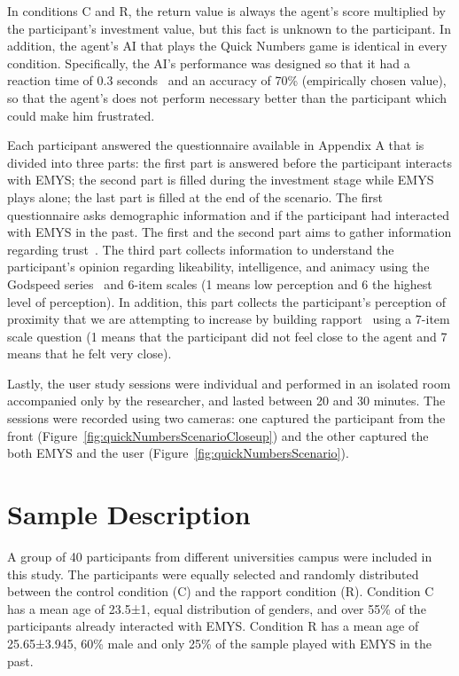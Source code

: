 In conditions C and R, the return value is always the agent's score multiplied by the participant's investment value, but this fact is unknown to the participant. In addition, the agent's \ac{AI} that plays the Quick Numbers game is identical in every condition. Specifically, the \ac{AI}'s performance was designed so that it had a reaction time of 0.3 seconds~\cite{Boot2008} and an accuracy of 70\% (empirically chosen value), so that the agent's does not perform necessary better than the participant which could make him frustrated.

Each participant answered the questionnaire available in Appendix A that is divided into three parts: the first part is answered before the participant interacts with \ac{EMYS}; the second part is filled during the investment stage while \ac{EMYS} plays alone; the last part is filled at the end of the scenario. The first questionnaire asks demographic information and if the participant had interacted with \ac{EMYS} in the past. The first and the second part aims to gather information regarding trust~\cite{carrington2007toward, schaefer2013perception}. The third part collects information to understand the participant's opinion regarding likeability, intelligence, and animacy using the Godspeed series~\cite{bartneck2009measurement, lehmann2015good} and 6-item scales (1 means low perception and 6 the highest level of perception). In addition, this part collects the participant's perception of proximity that we are attempting to increase by building rapport~\cite{aron1992inclusion} using a 7-item scale question (1 means that the participant did not feel close to the agent and 7 means that he felt very close).

Lastly, the user study sessions were individual and performed in an isolated room accompanied only by the researcher, and lasted between 20 and 30 minutes. The sessions were recorded using two cameras: one captured the participant from the front (Figure~\ref{fig:quickNumbersScenarioCloseup}) and the other captured the both \ac{EMYS} and the user (Figure~\ref{fig:quickNumbersScenario}).

\section{Sample Description}
\label{sec:sample}

A group of 40 participants from different universities campus were included in this study. The participants were equally selected and randomly distributed between the control condition (C) and the rapport condition (R). Condition C has a mean age of 23.5±1, equal distribution of genders, and over 55\% of the participants already interacted with \ac{EMYS}. Condition R has a mean age of 25.65±3.945, 60\% male and only 25\% of the sample played with \ac{EMYS} in the past.

